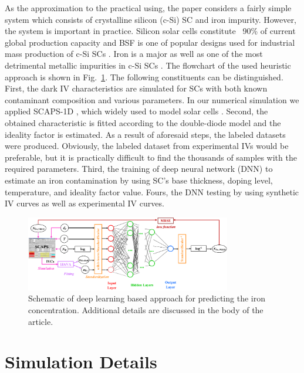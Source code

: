 \documentclass[num-refs]{wiley-article} %
\begin{document}
As the approximation to the practical using, the paper considers a fairly simple system
which consists of crystalline silicon (c-Si) SC  and iron impurity.
However, the system is important in practice.
Silicon solar cells constitute ~90\% of current global production capacity \cite{SCRev2015} and
BSF  is one of  popular designs used for industrial mass production of c-Si SCs \cite{SCRev2020}.
Iron is a major as well as one of the most detrimental metallic impurities in c-Si SCs \cite{ZHU2016192,FeB:Schmidt,IronSC}.
The flowchart of the used heuristic approach is shown in Fig.~\ref{fig_chem}.
The following constituents can be distinguished.
First, the dark IV characteristics are simulated for SCs with both known contaminant composition and various parameters.
In our numerical simulation we applied SCAPS-1D \cite{SCAPS1,SCAPS2},
which widely used to model solar cells \cite{SCAPSuseSi4,SCAPSuseSi1,SCAPSuseSi6,SCAPSuse1,SCAPSuse2020,SCAPSuse2017SM}.
Second, the obtained characteristic is fitted according to the double-diode model and the ideality factor is estimated.
As a result of aforesaid steps, the labeled datasets were produced.
Obviously, the labeled dataset from experimental IVs  would be preferable,
but it is practically difficult to find the thousands of samples with the required parameters.
Third, the training of deep neural network (DNN) to estimate an iron contamination  by using SC's base thickness, doping level,
temperature, and ideality factor value.
Fours, the DNN testing by using synthetic IV curves as well as experimental IV curves.

\begin{figure}
\centering
\includegraphics[width=0.8\textwidth]{Chem}
\caption{Schematic of deep learning based approach  for predicting the iron concentration.
Additional details are discussed in the body of the article.}
\label{fig_chem}
\end{figure}


\section{Simulation Details}
\end{document}
